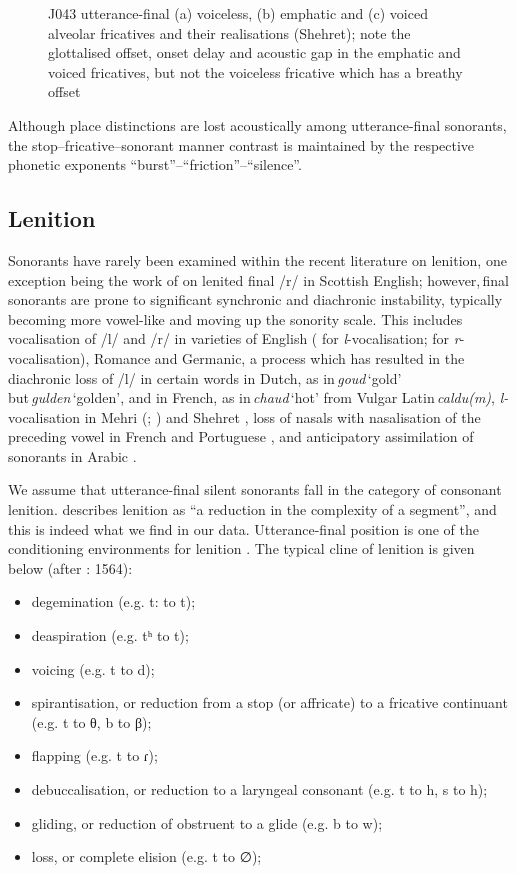 \documentclass[output=paper]{langscibook}
\begin{document}
\begin{figure}[t]
{}
\caption{J043 utterance-final (a) voiceless, (b) emphatic and (c) voiced alveolar fricatives and their realisations (Shehret); note the glottalised offset, onset delay and acoustic gap in the emphatic and voiced fricatives, but not the voiceless fricative which has a breathy offset}
\label{fig:watson:31}
\end{figure}

Although place distinctions are lost acoustically among utterance-final sonorants, the stop–fricative–sonorant manner contrast is maintained by the respective phonetic exponents ``burst''–``friction''–``silence''.

\subsection{{Lenition}}\label{sec:watson:5.3}
Sonorants have rarely been examined within the recent literature on lenition, one exception being the work of \citet{LawsonEtAl2015} on lenited final \mbox{/r/} in Scottish English; however, final sonorants are prone to significant synchronic and diachronic instability, typically becoming more vowel-like and moving up the sonority scale. This includes vocalisation of \mbox{/l/} and \mbox{/r/} in varieties of English (\citealt{Wells1982} for \textit{l}-vocalisation; \citealt{Lutz1994} for \textit{r}-vocalisation), Romance and Germanic, a process which has resulted in the diachronic loss of \mbox{/l/} in certain words in Dutch, as in \textit{goud} ‘gold’ but \textit{gulden} ‘golden’, and in French, as in \textit{chaud} ‘hot’ from Vulgar Latin \textit{caldu(m)}, \textit{l-}vocalisation in Mehri (\citealt{Rubin2014}; \citealt{WatsonEtAl2020}) and Shehret \citep{Rubin2014}, loss of nasals with nasalisation of the preceding vowel in French \citep{Rochet1976} and Portuguese \citep{Cruz-Ferreira1995}, and anticipatory assimilation of sonorants in Arabic \citep{Watson2002}.

{We assume that utterance-final silent sonorants fall in the category of consonant lenition. \citet[265]{Harris1990} describes lenition as ``a reduction in the complexity of a segment'', and this is indeed what we find in our data. Utterance-final position is one of the conditioning environments for lenition \citep[8]{Kirchner1998}. The typical cline of lenition is given below (after \citealt{Guravich2011}: 1564):}

\begin{itemize}
\item {degemination (e.g. t: to t);}
\item {deaspiration (e.g. tʰ to t);}
\item {voicing (e.g. t to d);}
\item {spirantisation, or reduction from a stop (or affricate) to a fricative continuant (e.g. t to θ, b to β);~}
\item {flapping (e.g. t to ɾ);}
\item {debuccalisation, or reduction to a laryngeal consonant (e.g. t to h, s to h);~}
\item {gliding, or reduction of obstruent to a glide (e.g. b to w);}
\item {loss, or complete elision (e.g. t to ∅);}
\end{itemize}
\end{document}
